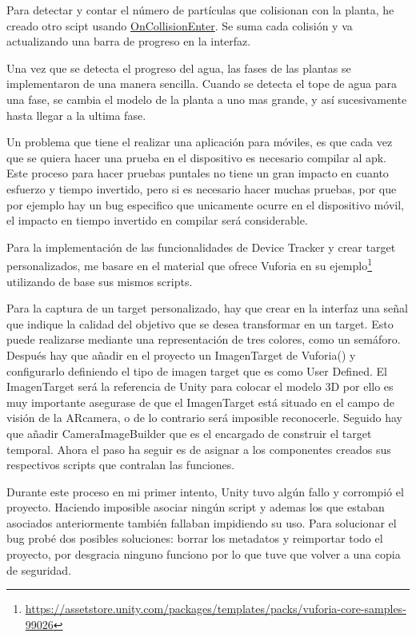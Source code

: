 Para detectar y contar el número de partículas que colisionan con la planta, he creado otro scipt usando \href{https://docs.unity3d.com/ScriptReference/Collider.OnCollisionEnter.html}{OnCollisionEnter}. Se suma cada colisión y va actualizando una barra de progreso en la interfaz.

Una vez que se detecta el progreso del agua, las fases de las plantas se implementaron de una manera sencilla. Cuando se detecta el tope de agua para una fase, se cambia el modelo de la planta a uno mas grande, y así sucesivamente hasta llegar a la ultima fase.

Un problema que tiene el realizar una aplicación para móviles, es que cada vez que se quiera hacer una prueba en el dispositivo es necesario compilar al apk. Este proceso para hacer pruebas puntales no tiene un gran impacto en cuanto esfuerzo y tiempo invertido, pero si es necesario hacer muchas pruebas, por que por ejemplo hay un bug especifico que unicamente ocurre en el dispositivo móvil, el impacto en tiempo invertido en compilar será considerable.


Para la implementación de las funcionalidades de Device Tracker y crear target personalizados, me basare en el material que ofrece Vuforia en su ejemplo\footnote{\url{https://assetstore.unity.com/packages/templates/packs/vuforia-core-samples-99026}} utilizando de base sus mismos scripts.

Para la captura de un target personalizado, hay que crear en la interfaz una señal que indique la calidad del objetivo que se desea transformar en un target.
Esto puede realizarse mediante una representación de tres colores, como un semáforo.
Después hay que añadir en el proyecto un ImagenTarget de Vuforia() y configurarlo definiendo el tipo de imagen target que es como User Defined. El ImagenTarget será la referencia de Unity para colocar el modelo 3D por ello es muy importante asegurase de que el ImagenTarget está situado en el campo de visión de la ARcamera, o de lo contrario será imposible reconocerle. 
Seguido hay que añadir CameraImageBuilder que es el encargado de construir el target temporal. 
Ahora el paso ha seguir es de asignar a los componentes creados sus respectivos scripts que contralan las funciones. 

Durante este proceso en mi primer intento, Unity tuvo algún fallo y corrompió el proyecto. Haciendo imposible asociar ningún script y ademas los que estaban asociados anteriormente también fallaban impidiendo su uso. Para solucionar el bug probé dos posibles soluciones: borrar los metadatos y reimportar todo el proyecto, por desgracia ninguno funciono por lo que tuve que volver a una copia de seguridad.



